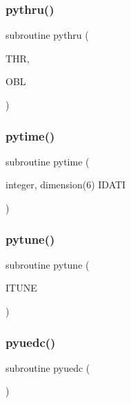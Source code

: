 \subsubsection{\texorpdfstring{pythru()}{pythru()}}
{\footnotesize\ttfamily subroutine pythru (\begin{DoxyParamCaption}\item[{}]{T\+HR,  }\item[{}]{O\+BL }\end{DoxyParamCaption})}

\mbox{\label{pythia-6_84_824_8f_a523e4acf745637220400daf831c34a23}} 
\subsubsection{\texorpdfstring{pytime()}{pytime()}}
{\footnotesize\ttfamily subroutine pytime (\begin{DoxyParamCaption}\item[{integer, dimension(6)}]{I\+D\+A\+TI }\end{DoxyParamCaption})}

\mbox{\label{pythia-6_84_824_8f_a5093064b30582e5e9082c351ef0d4ffe}} 
\subsubsection{\texorpdfstring{pytune()}{pytune()}}
{\footnotesize\ttfamily subroutine pytune (\begin{DoxyParamCaption}\item[{}]{I\+T\+U\+NE }\end{DoxyParamCaption})}

\mbox{\label{pythia-6_84_824_8f_ad4589c4d52b9eb7dbb722acc463b8ceb}} 
\subsubsection{\texorpdfstring{pyuedc()}{pyuedc()}}
{\footnotesize\ttfamily subroutine pyuedc (\begin{DoxyParamCaption}{ }\end{DoxyParamCaption})}

